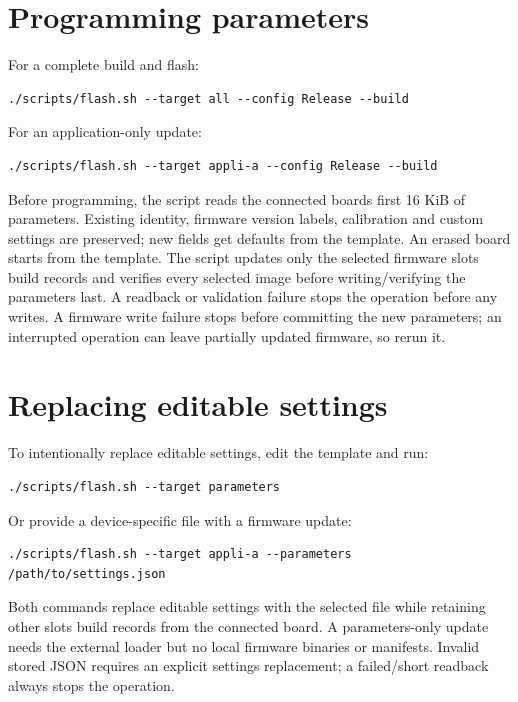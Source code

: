 \documentclass[10pt,a4paper,oneside]{report}
\begin{document}
\section{Programming parameters}\label{wiki-firmware-parameters--programming-parameters}

For a complete build and flash:

\begin{verbatim}
./scripts/flash.sh --target all --config Release --build
\end{verbatim}

For an application-only update:

\begin{verbatim}
./scripts/flash.sh --target appli-a --config Release --build
\end{verbatim}

Before programming, the script reads the connected board\textquotesingle s first 16 KiB of parameters. Existing identity, firmware version labels, calibration and custom settings are preserved; new fields get defaults from the template. An erased board starts from the template. The script updates only the selected firmware slots\textquotesingle{} build records and verifies every selected image before writing/verifying the parameters last. A readback or validation failure stops the operation before any writes. A firmware write failure stops before committing the new parameters; an interrupted operation can leave partially updated firmware, so rerun it.

\section{Replacing editable settings}\label{wiki-firmware-parameters--replacing-editable-settings}

To intentionally replace editable settings, edit the template and run:

\begin{verbatim}
./scripts/flash.sh --target parameters
\end{verbatim}

Or provide a device-specific file with a firmware update:

\begin{verbatim}
./scripts/flash.sh --target appli-a --parameters /path/to/settings.json
\end{verbatim}

Both commands replace editable settings with the selected file while retaining other slots\textquotesingle{} build records from the connected board. A parameters-only update needs the external loader but no local firmware binaries or manifests. Invalid stored JSON requires an explicit settings replacement; a failed/short readback always stops the operation.
\end{document}
